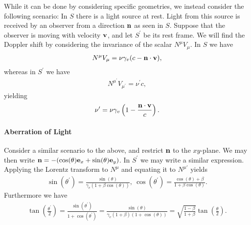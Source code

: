 While it can be done by considering specific geometries, we instead consider the following scenario: In $S$ there is a light source at rest. Light from this source is received by an observer from a direction $\vb{n}$ as seen in $S$. Suppose that the observer is moving with velocity $\vb{v}$, and let $S^{\prime}$ be its rest frame. We will find the Doppler shift by considering the invariance of the scalar $N^{\mu}V_{\mu}$. In $S$ we have
\begin{align*}
	N^{\mu}V_{\mu} = \nu\gamma_{v}(c - \vb{n}\cdot\vb{v}),
\end{align*}
whereas in $S^{\prime}$ we have
\begin{align*}
	N^{\mu^{\prime}}V_{\mu^{\prime}} = \nu^{\prime}c,
\end{align*}
yielding
\begin{align*}
	\nu^{\prime} = \nu\gamma_{v}\left(1 - \frac{\vb{n}\cdot\vb{v}}{c}\right).
\end{align*}

\paragraph{Aberration of Light}
Consider a similar scenario to the above, and restrict $\vb{n}$ to the $xy$-plane. We may then write $\vb{n} = -(\cos(\theta)\vb{e}_{x} + \sin(\theta)\vb{e}_{y})$. In $S^{\prime}$ we may write a similar expression. Applying the Lorentz transform to $N^{\mu}$ and equating it to $N^{\mu\prime}$ yields
\begin{align*}
	\sin(\theta^{\prime}) = \frac{\sin(\theta)}{\gamma_{v}(1 + \beta\cos(\theta))},\ \cos(\theta^{\prime}) = \frac{\cos(\theta) + \beta}{1 + \beta\cos(\theta)}.
\end{align*}
Furthermore we have
\begin{align*}
	\tan(\frac{\theta^{\prime}}{2}) = \frac{\sin(\theta^{\prime})}{1 + \cos(\theta^{\prime})} = \frac{\sin(\theta)}{\gamma_{v}(1 + \beta)(1 + \cos(\theta))} = \sqrt{\frac{1 - \beta}{1 + \beta}}\tan(\frac{\theta}{2}).
\end{align*}